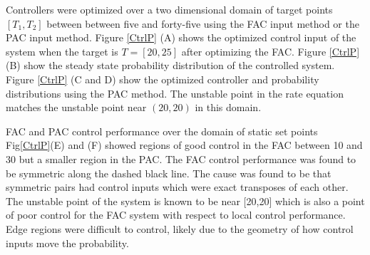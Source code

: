 \documentclass[12pt]{iopart}
\begin{document}
Controllers were optimized over a two dimensional domain of target points $[T_1,T_2]$ between between five and forty-five using the FAC input method or the PAC input method. Figure \ref{CtrlP} (A) shows the optimized control input of the system when the target is $T=[20,25]$ after optimizing the FAC. Figure \ref{CtrlP} (B) show the steady state probability distribution of the controlled system.  Figure \ref{CtrlP} (C and D) show the optimized controller and probability distributions using the PAC method. The unstable point in the rate equation matches the unstable point near $(20,20)$ in this domain.

FAC and PAC control performance over the domain of static set points Fig\ref{CtrlP}(E) and (F) showed regions of good control in the FAC between 10 and 30 but a smaller region in the PAC. The FAC control performance was found to be symmetric along the dashed black line. The cause was found to be that symmetric pairs had control inputs which were exact transposes of each other. The unstable point of the system is known to be near [20,20] which is also a point of poor control for the FAC system with respect to local control performance. Edge regions were difficult to control, likely due to the geometry of how control inputs move the probability.
\end{document}
